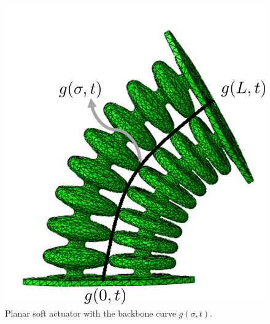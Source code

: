   \begin{minipage}{\linewidth}
      \centering
      \begin{minipage}{0.45\linewidth}
        \begin{figure}[H]
        \centering
            \includegraphics[width=\textwidth]{Figures/Chapter2/schematickinematic.png}
            \caption{Planar soft actuator with the backbone curve $g(\sigma,t)$.}
            \label{fig2:kinematicschematic}
        \end{figure}
      \end{minipage}
      \hspace{0.05\linewidth}
      \begin{minipage}{0.45\linewidth}
          \begin{figure}[H]

\end{figure}
\end{minipage}
\end{minipage}
